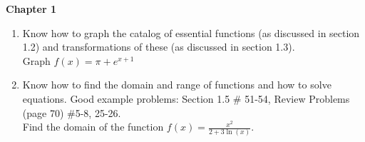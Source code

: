 \documentclass[12pt]{article}
\begin{document}
\textbf{Chapter 1}
\begin{enumerate}
\item Know how to graph the catalog of essential functions (as discussed in section 1.2) and transformations of these (as discussed in section 1.3).\\

Graph $f(x)=\pi+e^{x+1}$\\

\item Know how to find the domain and range of functions and how to solve equations. Good example problems: Section 1.5 \# 51-54, Review Problems (page 70) \#5-8, 25-26.\\

Find the domain of the function $f(x)=\frac{x^2}{2+3 \ln (x)}.$
\end{enumerate}
	
\end{document}
